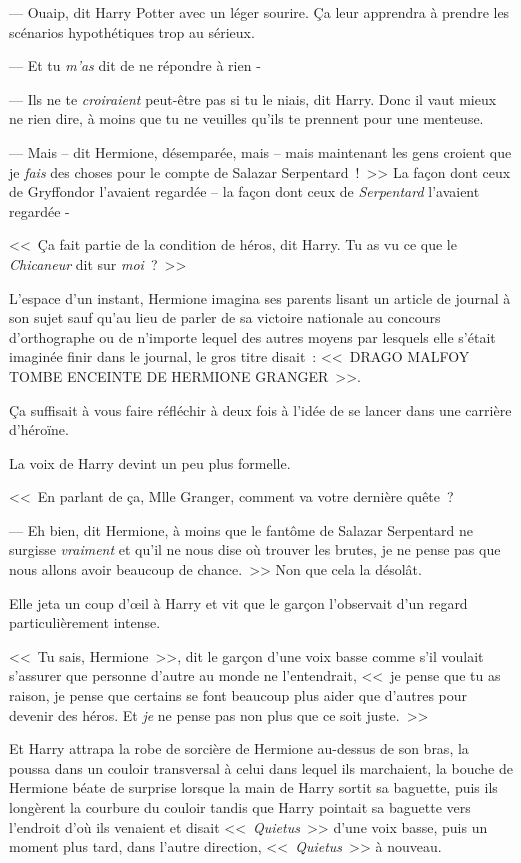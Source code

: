 --- Ouaip, dit Harry Potter avec un léger sourire. Ça leur apprendra à prendre les scénarios hypothétiques trop au sérieux.

--- Et tu \emph{m'as} dit de ne répondre à rien -

--- Ils ne te \emph{croiraient} peut-être pas si tu le niais, dit Harry. Donc il vaut mieux ne rien dire, à moins que tu ne veuilles qu'ils te prennent pour une menteuse.

--- Mais -- dit Hermione, désemparée, mais -- mais maintenant les gens croient que je \emph{fais} des choses pour le compte de Salazar Serpentard~!~>> La façon dont ceux de Gryffondor l'avaient regardée -- la façon dont ceux de \emph{Serpentard} l'avaient regardée -

<<~Ça fait partie de la condition de héros, dit Harry. Tu as vu ce que le \emph{Chicaneur} dit sur \emph{moi}~?~>>

L'espace d'un instant, Hermione imagina ses parents lisant un article de journal à son sujet sauf qu'au lieu de parler de sa victoire nationale au concours d'orthographe ou de n'importe lequel des autres moyens par lesquels elle s'était imaginée finir dans le journal, le gros titre disait~: <<~DRAGO MALFOY TOMBE ENCEINTE DE HERMIONE GRANGER~>>.

Ça suffisait à vous faire réfléchir à deux fois à l'idée de se lancer dans une carrière d'héroïne.

La voix de Harry devint un peu plus formelle.

<<~En parlant de ça, Mlle Granger, comment va votre dernière quête~?

--- Eh bien, dit Hermione, à moins que le fantôme de Salazar Serpentard ne surgisse \emph{vraiment} et qu'il ne nous dise où trouver les brutes, je ne pense pas que nous allons avoir beaucoup de chance.~>> Non que cela la désolât.

Elle jeta un coup d'œil à Harry et vit que le garçon l'observait d'un regard particulièrement intense.

<<~Tu sais, Hermione~>>, dit le garçon d'une voix basse comme s'il voulait s'assurer que personne d'autre au monde ne l'entendrait, <<~je pense que tu as raison, je pense que certains se font beaucoup plus aider que d'autres pour devenir des héros. Et \emph{je} ne pense pas non plus que ce soit juste.~>>

Et Harry attrapa la robe de sorcière de Hermione au-dessus de son bras, la poussa dans un couloir transversal à celui dans lequel ils marchaient, la bouche de Hermione béate de surprise lorsque la main de Harry sortit sa baguette, puis ils longèrent la courbure du couloir tandis que Harry pointait sa baguette vers l'endroit d'où ils venaient et disait <<~\emph{Quietus}~>> d'une voix basse, puis un moment plus tard, dans l'autre direction, <<~\emph{Quietus}~>> à nouveau.

